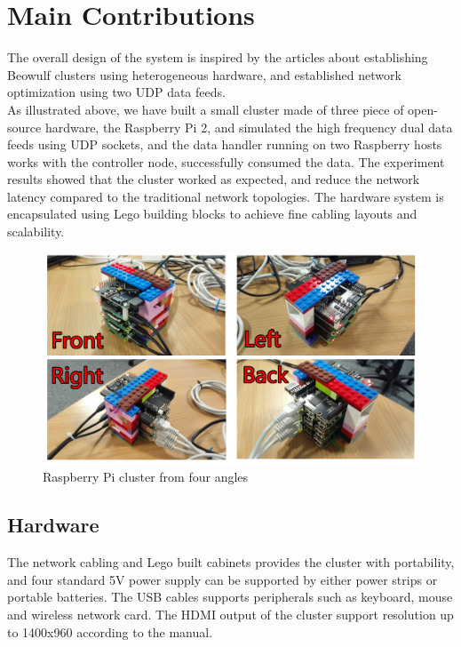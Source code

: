 \documentclass[11pt,openright,a4paper]{report}
\begin{document}
\section{Main Contributions}
The overall design of the system is inspired by the articles about establishing Beowulf clusters using heterogeneous hardware\cite{kiepert2013creating}, and established network optimization using two UDP data feeds\cite{chordia2013high}. \\
As illustrated above, we have built a small cluster made of three piece of open-source hardware, the Raspberry Pi 2, and simulated the high frequency dual data feeds using UDP sockets, and the data handler running on two Raspberry hosts works with the controller node, successfully consumed the data. The experiment results showed that the cluster worked as expected, and reduce the network latency compared to the traditional network topologies. The hardware system is encapsulated using Lego building blocks to achieve fine cabling layouts and scalability.\\ 
\begin{figure}[H]
	\centering
	\includegraphics[width=0.9\linewidth]{picture/photo/fourScene}
	\caption{Raspberry Pi cluster from four angles}
	\label{fig:fourScene}
\end{figure}
\subsection{Hardware}
The network cabling and Lego built cabinets provides the cluster with portability, and four standard 5V power supply can be supported by either power strips or portable batteries. The USB cables supports peripherals such as keyboard, mouse and wireless network card. The HDMI output of the cluster support resolution up to 1400x960 according to the manual\cite{upton2014raspberry}.\\
\end{document}
